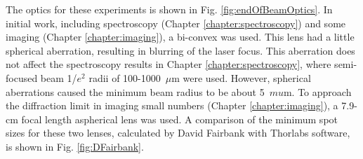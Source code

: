 The optics for these experiments is shown in Fig. \ref{fig:endOfBeamOptics}.  In initial work, including spectroscopy (Chapter \ref{chapter:spectroscopy}) and some imaging (Chapter \ref{chapter:imaging}), a bi-convex was used.  This lens had a little spherical aberration, resulting in blurring of the laser focus.  This aberration does not affect the spectroscopy results in Chapter \ref{chapter:spectroscopy}, where semi-focused beam 1/$e^{2}$ radii of 100-1000~$\mu$m were used.  However, spherical aberrations caused the minimum beam radius to be about 5~$mu$m.  To approach the diffraction limit in imaging small numbers (Chapter \ref{chapter:imaging}), a 7.9-cm focal length aspherical lens was used.  A comparison of the minimum spot sizes for these two lenses, calculated by David Fairbank with Thorlabs software, is shown in Fig. \ref{fig:DFairbank}.

